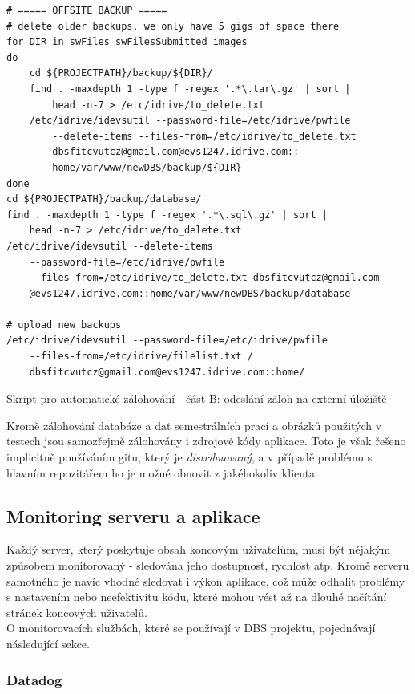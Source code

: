 \begin{listing}[H]
	\begin{verbatim}
# ===== OFFSITE BACKUP =====
# delete older backups, we only have 5 gigs of space there
for DIR in swFiles swFilesSubmitted images
do
    cd ${PROJECTPATH}/backup/${DIR}/
    find . -maxdepth 1 -type f -regex '.*\.tar\.gz' | sort |
        head -n-7 > /etc/idrive/to_delete.txt
    /etc/idrive/idevsutil --password-file=/etc/idrive/pwfile
        --delete-items --files-from=/etc/idrive/to_delete.txt
        dbsfitcvutcz@gmail.com@evs1247.idrive.com::
        home/var/www/newDBS/backup/${DIR}
done
cd ${PROJECTPATH}/backup/database/
find . -maxdepth 1 -type f -regex '.*\.sql\.gz' | sort |
    head -n-7 > /etc/idrive/to_delete.txt
/etc/idrive/idevsutil --delete-items
    --password-file=/etc/idrive/pwfile
    --files-from=/etc/idrive/to_delete.txt dbsfitcvutcz@gmail.com
    @evs1247.idrive.com::home/var/www/newDBS/backup/database

# upload new backups
/etc/idrive/idevsutil --password-file=/etc/idrive/pwfile
    --files-from=/etc/idrive/filelist.txt /
    dbsfitcvutcz@gmail.com@evs1247.idrive.com::home/
	\end{verbatim}
	\caption{Skript pro automatické zálohování - část B: odeslání záloh na externí úložiště} \label{code:backup-b}
\end{listing}
Kromě zálohování databáze a dat semestrálních prací a obrázků použitých v testech jsou samozřejmě zálohovány i zdrojové kódy aplikace. Toto je však řešeno implicitně používáním gitu, který je \emph{distribuovaný}, a v případě problému s hlavním repozitářem ho je možné obnovit z jakéhokoliv klienta.

\subsection{Monitoring serveru a aplikace}

Každý server, který poskytuje obsah koncovým uživatelům, musí být nějakým způsobem monitorovaný - sledována jeho dostupnost, rychlost atp. Kromě serveru samotného je navíc vhodné sledovat i výkon aplikace, což může odhalit problémy s nastavením nebo neefektivitu kódu, které mohou vést až na dlouhé načítání stránek koncových uživatelů.\\
O monitorovacích službách, které se používají v DBS projektu, pojednávají následující sekce.

\subsubsection{Datadog} \label{app:datadog}

